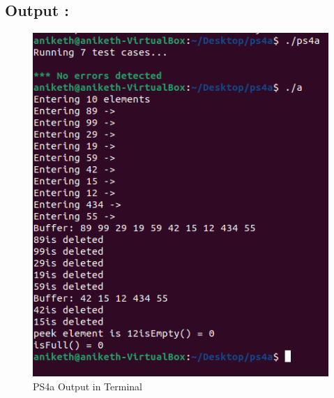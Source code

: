 \subsection{Output :}
\begin{figure}[h]
   \centering
    \includegraphics[width=1\textwidth]{ps4a/ps4a.png}
    \caption{PS4a Output in Terminal}
    \label{fig:ps4a}
\end{figure}


\newpage
